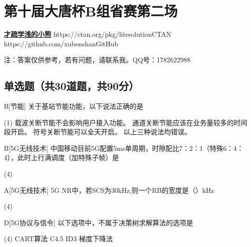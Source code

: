 \chapter{第十届大唐杯B组省赛第二场}
\fancyhead[R]{\color{H6}\kaishu\rightmark\,}

\date{2023年4月16日}{}{\href{https://qm.qq.com/q/UPbGudx8cK}{\textbf{才疏学浅的小熊}}}
{}
{https://ctan.org/pkg/litesolution}{CTAN}
{https://github.com/xubenshan}{GitHub}

注：答案仅供参考，若有问题，请联系我。QQ号：1782622988

\section{单选题（共30道题，共90分）}



\begin{choice}{B}[节能]
    关于基站节能功能，以下说法正确的是
    \begin{tasks}(1)
        \task 载波关断节能不会影响用户接入功能。
        \task 通道关断节能应该在业务量较多的时间段开启。
        \task 符号关断节能可以全天开启。
        \task 以上三种说法均错误。
    \end{tasks}
\end{choice}


\begin{choice}{B}[5G无线技术]
    中国移动目前5G配置5ms单周期，时隙配比7：2：1（特殊6：4：4），此时上行满调度（加特殊子帧）是
    \begin{tasks}(4)
    \end{tasks}
\end{choice}




\begin{choice}{A}[5G无线技术]
    5G NR中，若SCS为30kHz,则一个RB的宽度是（\qquad）kHz
    \begin{tasks}(4)
    \end{tasks}
\end{choice}


\begin{choice}{D}[5G协议与信令]
    以下选项中，不属于决策树求解算法的选项是
    \begin{tasks}(4)
        \task CART算法
        \task C4.5
        \task ID3
        \task 梯度下降法
    \end{tasks}
\end{choice}

